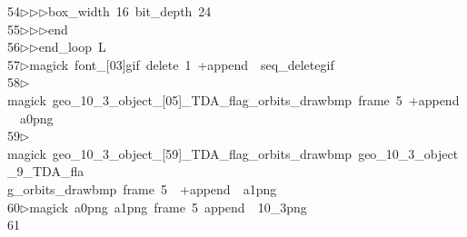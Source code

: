 \begin{tabbing}
54\>$\triangleright$\>$\triangleright$\>$\triangleright$\>box\_width\ 16\ bit\_depth\ 24\ \\[0pt]
55\>$\triangleright$\>$\triangleright$\>$\triangleright$\>end\ \\[0pt]
56\>$\triangleright$\>$\triangleright$\>end\_loop\ L\\[0pt]
57\>$\triangleright$\>magick\ font\_[03]gif\ delete\ 1\ +append\ \ seq\_deletegif\\[0pt]
58\>$\triangleright$\>magick\ geo\_10\_3\_object\_[05]\_TDA\_flag\_orbits\_drawbmp\ frame\ 5\ +append\ \ a0png\\[0pt]
59\>$\triangleright$\>magick\ geo\_10\_3\_object\_[59]\_TDA\_flag\_orbits\_drawbmp\ geo\_10\_3\_object\_9\_TDA\_fla\\[0pt]
\>g\_orbits\_drawbmp\ frame\ 5\ \ +append\ \ a1png\\[0pt]
60\>$\triangleright$\>magick\ a0png\ a1png\ frame\ 5\ append\ \ 10\_3png\\[0pt]
61\>\end{tabbing}
